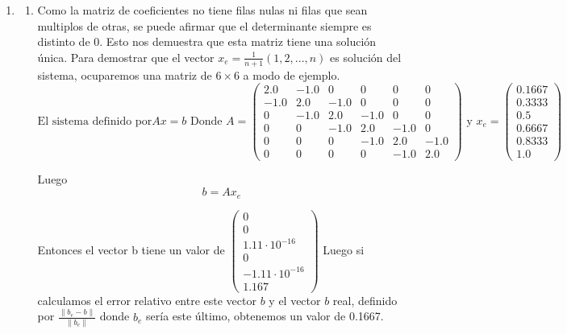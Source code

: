 \documentclass{udpreport}
\providecommand{\norm}[1]{\lVert#1\rVert}
\begin{document}
\begin{enumerate}
\begin{enumerate}
		\end{enumerate} 	  
	\item
 		\begin{enumerate}
			\item Como la matriz de coeficientes no tiene filas nulas ni filas que sean multiplos de otras, se puede afirmar que el determinante siempre es distinto de 0. Esto nos demuestra que esta matriz tiene una solución única. Para demostrar que el vector $x_{e} = \frac{1}{n+1}(1,2,...,n)$ es solución del sistema, ocuparemos una matriz de $6 \times 6$ a modo de ejemplo.
			\begin{equation}
				\textrm{El sistema definido por} Ax = b
				\textrm{ Donde } A = \left(\begin{array}{cccccc} 2.0 & -1.0 & 0 & 0 & 0 & 0\\ -1.0 & 2.0 & -1.0 & 0 & 0 & 0\\ 0 & -1.0 & 2.0 & -1.0 & 0 & 0\\ 0 & 0 & -1.0 & 2.0 & -1.0 & 0\\ 0 & 0 & 0 & -1.0 & 2.0 & -1.0\\ 0 & 0 & 0 & 0 & -1.0 & 2.0 \end{array}\right)
				\textrm{ y } x_{e} = \left(\begin{array}{c} 0.1667\\ 0.3333\\ 0.5\\ 0.6667\\ 0.8333\\ 1.0 \end{array}\right)
			\end{equation}			 
			
			Luego 
			\begin{equation}
				b = Ax_{e}
			\end{equation}
			
			Entonces el vector b tiene un valor de $\left(\begin{array}{c} 0\\ 0\\ 1.11\cdot 10^{-16}\\ 0\\ -1.11\cdot 10^{-16}\\ 1.167 \end{array}\right)$
			Luego si calculamos el error relativo entre este vector $b$ y el vector $b$ real, definido por $\frac{\norm{b_{e}-b}}{\norm{b_{e}}}$ donde $b_{e}$ sería este último, obtenemos un valor de 0.1667. 
			

\end{enumerate}
\end{enumerate}
\end{document}
